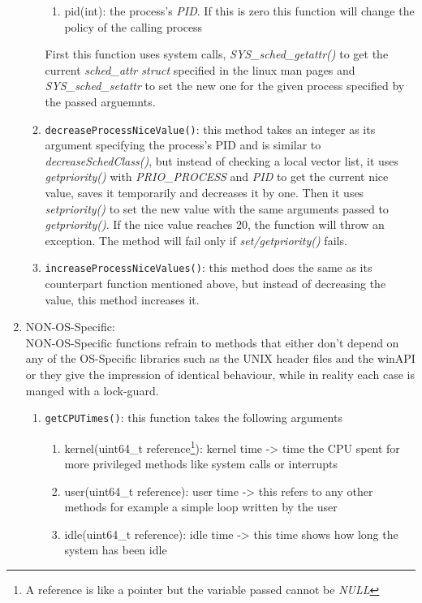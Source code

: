 \begin{enumerate}
\begin{enumerate}
\begin{enumerate}
			\item pid(int): the process's \textit{PID}. If this is zero this function will change the policy of the calling process
		\end{enumerate}
		First this function uses system calls, \textit{SYS\_sched\_getattr()} to get the current \textit{sched\_attr struct} specified in the linux man pages and \textit{SYS\_sched\_setattr} to set the new one for the given process specified by the passed arguemnts\cite{linux-man-set/getattribute}.
		\item \texttt{decreaseProcessNiceValue()}: this method takes an integer as its argument specifying the process's PID and is similar to \textit{decreaseSchedClass()}, but instead of checking a local vector list, it uses \textit{getpriority()} with \textit{PRIO\_PROCESS} and \textit{PID} to get the current nice value, saves it temporarily and decreases it by one. Then it uses \textit{setpriority()} to set the new value with the same arguments passed to \textit{getpriority()}. If the nice value reaches 20, the function will throw an exception. The method will fail only if \textit{set/getpriority()} fails.
		\item \texttt{increaseProcessNiceValues()}: this method does the same as its counterpart function mentioned above, but instead of decreasing the value, this method increases it.
	\end{enumerate}
	\item NON-OS-Specific:\\
	NON-OS-Specific functions refrain to methods that either don't depend on any of the OS-Specific libraries such as the UNIX header files and the winAPI or they give the impression of identical behaviour, while in reality each case is manged with a lock-guard. 
	\begin{enumerate}
		\item \texttt{getCPUTimes()}: this function takes the following arguments
		\begin{enumerate}
			\item kernel(uint64\_t reference\footnote{A reference is like a pointer but the variable passed cannot be \textit{NULL}}): kernel time -> time the CPU spent for more \dq privileged\dq{} methods like system calls or interrupts
			\item user(uint64\_t reference): user time -> this refers to any other methods for example a simple loop written by the user
			\item idle(uint64\_t reference): idle time -> this time shows how long the system has been idle 

\end{enumerate}
\end{enumerate}
\end{enumerate}
